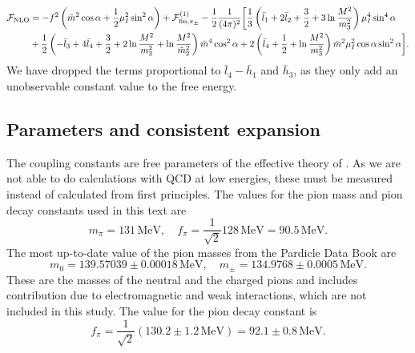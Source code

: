 \begin{align}
    \nonumber
    \Eff_{\mathrm{NLO}} &=
    - f^2 \left(\bar m^2 \cos \alpha + \frac{1}{2}\mu_I^2 \sin^2 \alpha\right)
    + \Eff^{(1)}_{\mathrm{fin}, \pi_\pm}
    - \frac{1}{2}\frac{1}{(4 \pi)^2}
    \bigg[
        \frac{1}{3}
        \left( 
            \bar l_1 + 2 \bar l_2 + \frac{3}{2} + 3 \ln \frac{M^2}{m_3^2}
        \right) \mu_I^4 \sin^4 \alpha
        \\ %
        &
        +
        \frac{1}{2}
        \left(
            - \bar l_3 + 4 \bar l_4 + \frac{3}{2} + 2\ln \frac{M^2}{m_3^2}
            + \ln \frac{M^2}{\tilde m^2_2}
        \right) \bar m^4 \cos^2\alpha 
        + 2 \left(\bar l_4 + \frac{1}{2} + \ln \frac{M^2}{m_3^2}\right)
        \bar m^2 \mu_I^2 \cos\alpha \sin^2 \alpha
        \label{NLO free energy}
    \bigg].
\end{align}
%
We have dropped the terms proportional to $\bar l_4 - \bar h_1$ and $\bar h_3$, as they only add an unobservable constant value to the free energy.


\subsection{Parameters and consistent expansion}

The coupling constants are free parameters of the effective theory of \chpt.
As we are not able to do calculations with QCD at low energies, these must be measured instead of calculated from first principles.
The values for the pion mass and pion decay constants used in this text are
%
\begin{equation}
    m_\pi = 131 \, \mathrm{MeV}, \quad 
    f_\pi = \frac{1}{\sqrt 2} 128 \, \mathrm{MeV} = 90.5 \, \mathrm{MeV}.
\end{equation}
%
The most up-to-date value of the pion masses from the Pardicle Data Book are~\cite{particledatagroupReviewParticlePhysics2020}
%
\begin{equation}
    m_0 = 139.57039\pm0.00018\, \text{MeV}, \quad
    m_\pm = 134.9768\pm0.0005\, \text{MeV}.
\end{equation}
%
These are the masses of the neutral and the charged pions and includes contribution due to electromagnetic and weak interactions, which are not included in this study.
The value for the pion decay constant is~\cite{particledatagroupReviewParticlePhysics2020}
%
\begin{equation}
    f_\pi = \frac{1}{\sqrt{2}} (130.2 \pm 1.2 \, \text{MeV})
    = 92.1 \pm 0.8 \, \text{MeV}.
\end{equation}
%

